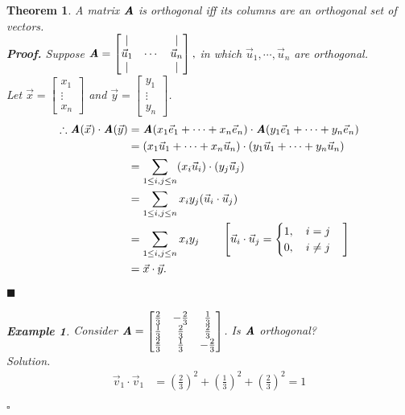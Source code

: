 \documentclass[12pt, a4paper]{article}
\newtheorem{thm}{Theorem}[subsection]
\newtheorem{eg}{Example}[subsection]
\newenvironment*{sol}{\indent\textit{Solution. }}{\hfill{$\square$}\par}
\newenvironment*{prf}{\indent\textbf{\textit{Proof. }}}{\hfill $\blacksquare$\par}
\def\vecx{\vec{x}}
\def\vecy{\vec{y}}
\def\vecv{\vec{v}}
\def\vecu{\vec{u}}
\def\vece{\vec{e}}
\def\matrixA{\textbf{\emph{A}}}
\begin{document}
\begin{thm}
	A matrix $\matrixA$ is orthogonal \emph{iff} its columns are an orthogonal set of vectors. \\
	\begin{prf}
		Suppose $\matrixA=\begin{bmatrix}|&&|\\\vecu_1&\cdots&\vecu_n\\|&&|\end{bmatrix},$ in which $\vecu_1,\cdots,\vecu_n$ are orthogonal. \\
		Let $\vecx=\begin{bmatrix}x_1\\\vdots\\x_n\end{bmatrix}$ and $\vecy=\begin{bmatrix}y_1\\\vdots\\y_n\end{bmatrix}$.
		$$\begin{aligned}
			\therefore\matrixA(\vecx)\cdot\matrixA(\vecy)&=\matrixA(x_1\vece_1+\cdots+x_n\vece_n)\cdot\matrixA(y_1\vece_1+\cdots+y_n\vece_n)\\
			&=(x_1\vecu_1+\cdots+x_n\vecu_n)\cdot(y_1\vecu_1+\cdots+y_n\vecu_n)\\
			&=\sum_{1\leq i,j\leq n}(x_i\vecu_i)\cdot (y_j\vecu_j)\\
			&=\sum_{1\leq i,j\leq n}x_iy_j(\vecu_i\cdot\vecu_j)\\
			&=\sum_{1\leq i,j\leq n}x_iy_j\qquad\left[\vecu_i\cdot\vecu_j=\begin{cases}1,\quad i=j\\0,\quad i\neq j\end{cases}\right]\\
			&=\vecx\cdot\vecy.
		\end{aligned}$$
	\end{prf}
	\begin{eg}
		Consider $\matrixA=\begin{bmatrix}\frac{2}{3}&-\frac{2}{3}&\frac{1}{3}\\\frac{1}{3}&\frac{2}{3}&\frac{2}{3}\\\frac{2}{3}&\frac{1}{3}&-\frac{2}{3}\end{bmatrix}$. Is $\matrixA$ orthogonal?\\
		\begin{sol}
			$$\begin{aligned}
				\vecv_1\cdot\vecv_1&=\left(\frac{2}{3}\right)^2+\left(\frac{1}{3}\right)^2+\left(\frac{2}{3}\right)^2=1	\\

\end{aligned}$$
\end{sol}
\end{eg}
\end{thm}
\end{document}
